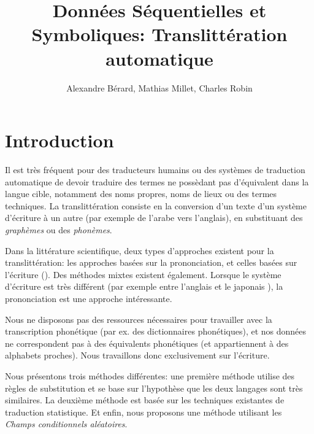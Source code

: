 \documentclass{article}
\begin{document}
\title{Données Séquentielles et Symboliques: Translittération automatique}

\author{Alexandre Bérard, Mathias Millet, Charles Robin}
\maketitle
\begin{abstract}
\end{abstract}
\vspace{0.5em}
\section{Introduction}

Il est très fréquent pour des traducteurs humains ou des systèmes de traduction automatique de devoir traduire des termes ne possèdant pas d'équivalent dans la langue cible, notamment des noms propres, noms de lieux ou des termes techniques.
La translittération consiste en la conversion d'un texte d'un système d'écriture à un autre (par exemple de l'arabe vers l'anglais), en substituant des \emph{graphèmes} ou des \emph{phonèmes}.

Dans la littérature scientifique, deux types d'approches existent pour la translittération: les approches basées sur la prononciation, et celles basées sur l'écriture (\cite{OhChoi06}). Des méthodes mixtes existent également. Lorsque le système d'écriture est très différent (par exemple entre l'anglais et le japonais \cite{Knight98}), la prononciation est une approche intéressante.

Nous ne disposons pas des ressources nécessaires pour travailler avec la transcription phonétique (par ex. des dictionnaires phonétiques), et nos données ne correspondent pas à des équivalents phonétiques (et appartiennent à des alphabets proches). Nous travaillons donc exclusivement sur l'écriture.


Nous présentons trois méthodes différentes: une première méthode utilise des règles de substitution et se base sur l'hypothèse que les deux langages sont très similaires. La deuxième méthode est basée sur les techniques existantes de traduction statistique. Et enfin, nous proposons une méthode utilisant les \emph{Champs conditionnels aléatoires}.
\end{document}
